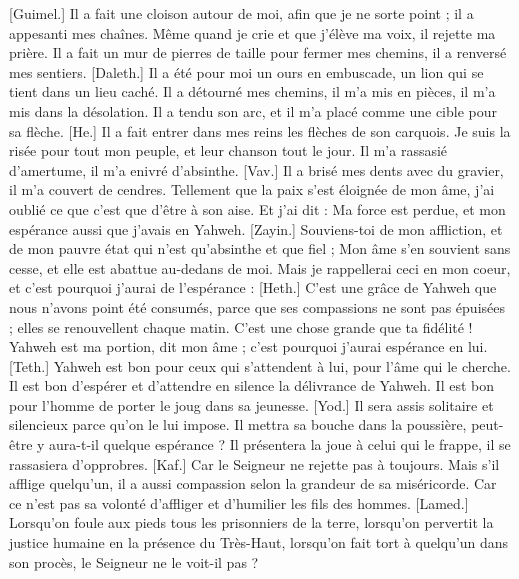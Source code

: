 \begin{multicols}{2}
[Guimel.] Il a fait une cloison autour de moi, afin que je ne sorte point ; il a appesanti mes chaînes.
Même quand je crie et que j'élève ma voix, il rejette ma prière.
Il a fait un mur de pierres de taille pour fermer mes chemins, il a renversé mes sentiers.
[Daleth.] Il a été pour moi un ours en embuscade, un lion qui se tient dans un lieu caché.
Il a détourné mes chemins, il m'a mis en pièces, il m'a mis dans la désolation.
Il a tendu son arc, et il m'a placé comme une cible pour sa flèche.
[He.] Il a fait entrer dans mes reins les flèches de son carquois.
Je suis la risée pour tout mon peuple, et leur chanson tout le jour.
Il m'a rassasié d'amertume, il m'a enivré d'absinthe.
[Vav.] Il a brisé mes dents avec du gravier, il m'a couvert de cendres.
Tellement que la paix s'est éloignée de mon âme, j'ai oublié ce que c'est que d'être à son aise.
Et j'ai dit : Ma force est perdue, et mon espérance aussi que j'avais en Yahweh.
[Zayin.] Souviens-toi de mon affliction, et de mon pauvre état qui n'est qu'absinthe et que fiel ;
Mon âme s'en souvient sans cesse, et elle est abattue au-dedans de moi.
Mais je rappellerai ceci en mon coeur, et c'est pourquoi j'aurai de l'espérance :
[Heth.] C'est une grâce de Yahweh que nous n'avons point été consumés, parce que ses compassions ne sont pas épuisées ;
elles se renouvellent chaque matin. C'est une chose grande que ta fidélité !
Yahweh est ma portion, dit mon âme ; c'est pourquoi j'aurai espérance en lui.
[Teth.] Yahweh est bon pour ceux qui s'attendent à lui, pour l'âme qui le cherche.
Il est bon d'espérer et d'attendre en silence la délivrance de Yahweh.
Il est bon pour l'homme de porter le joug dans sa jeunesse.
[Yod.] Il sera assis solitaire et silencieux parce qu'on le lui impose.
Il mettra sa bouche dans la poussière, peut-être y aura-t-il quelque espérance ?
Il présentera la joue à celui qui le frappe, il se rassasiera d'opprobres.
[Kaf.] Car le Seigneur ne rejette pas à toujours.
Mais s'il afflige quelqu'un, il a aussi compassion selon la grandeur de sa miséricorde.
Car ce n'est pas sa volonté d'affliger et d'humilier les fils des hommes.
[Lamed.] Lorsqu'on foule aux pieds tous les prisonniers de la terre,
lorsqu'on pervertit la justice humaine en la présence du Très-Haut,
lorsqu'on fait tort à quelqu'un dans son procès, le Seigneur ne le voit-il pas ?

\end{multicols}
